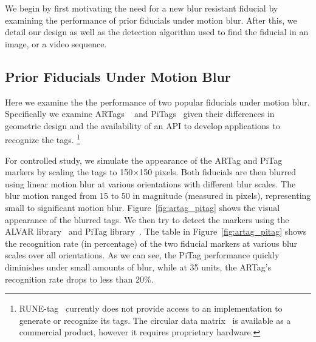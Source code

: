 \documentclass[10pt,twocolumn,letterpaper]{article}
\begin{document}
We begin by first motivating the need for a new blur resistant
fiducial by examining the performance of prior fiducials under motion
blur.  After this, we detail our design as well as the detection
algorithm used to find the fiducial in an image, or a video sequence.

\subsection{Prior Fiducials Under Motion Blur}\label{sec:blurtest}

Here we examine the the performance of two popular fiducials under
motion blur.  Specifically we examine ARTags ~\cite{Fiala05} and
PiTags~\cite{Pitag13} given their differences in geometric design and
the availability of an API to develop applications to recognize the tags.
\footnote{RUNE-tag~\cite{runetag11} currently does not provide access to  an
implementation to generate or recognize its tags.  The circular data
matrix~\cite{NaimarkF02} is available as a commercial product, however
it requires proprietary hardware.}

For controlled study, we simulate the appearance of the ARTag and PiTag
markers by scaling the tags to 150$\times$150 pixels.
Both fiducials are then blurred using linear motion blur at various
orientations with different  blur scales. The blur motion ranged from 15 to 50
in magnitude (measured in pixels), representing small to significant motion
blur. Figure~\ref{fig:artag_pitag} shows the visual appearance of the blurred
tags. We then try to detect the markers using the ALVAR library~\cite{alvar} and
PiTag library~\cite{ros_pitag}. The table in %
Figure~\ref{fig:artag_pitag} shows the recognition rate (in
percentage) of the two
fiducial markers at various blur scales over all  orientations.
As we can see, the PiTag performance quickly diminishes under small amounts of
blur, while at 35 units, the ARTag's recognition rate drops to less than
20\%.
\end{document}
